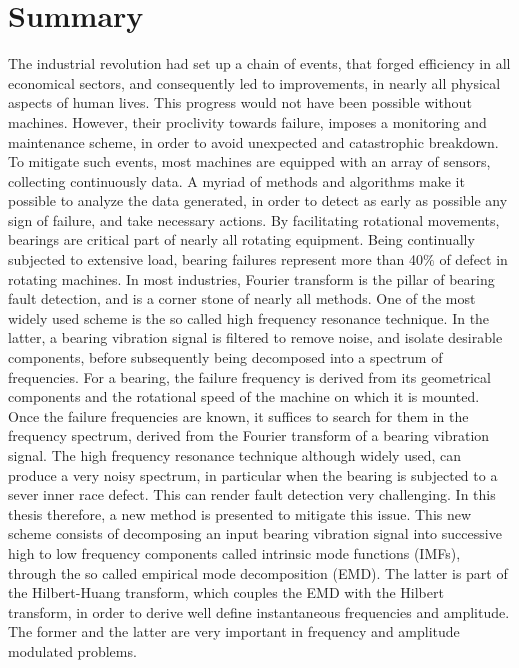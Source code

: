\documentclass[../Main/thesis.tex]{subfiles}
\begin{document}
	\section{Summary}
	\label{sec:summary_and_conclusions}
	The industrial revolution had set up a chain of events, that forged efficiency in all economical sectors, and consequently led to improvements, in nearly all physical aspects of human lives. This progress would not have been possible without machines. However, their proclivity towards failure, imposes a monitoring and maintenance scheme, in order to avoid unexpected and catastrophic breakdown. To mitigate such events, most machines are equipped with an array of sensors, collecting continuously data. A myriad of methods and algorithms make it possible to analyze the data generated, in order to detect as early as possible any sign of failure, and take necessary actions.
	\justify
	By facilitating rotational movements, bearings are critical part of nearly all rotating equipment. Being continually subjected to extensive load, bearing failures represent more than 40$\%$ of defect in rotating machines. In most industries, Fourier transform is the pillar of bearing fault detection, and is a corner stone of nearly all methods.
	One of the most widely used scheme is the so called high frequency resonance technique. 
	In the latter, a bearing vibration signal is filtered to remove noise, and isolate desirable components, before subsequently being decomposed into a spectrum of frequencies. For a bearing, the failure frequency is derived from its geometrical components and the rotational speed of the machine on which it is mounted. Once the failure frequencies are known, it suffices to search for them in the frequency spectrum, derived from the Fourier transform of a bearing vibration signal. 
	\justify
	The high frequency resonance technique although widely used, can produce a very noisy spectrum, in particular when the bearing is subjected to a sever inner race defect. This can render fault detection very challenging. In this thesis therefore, a new method is presented to mitigate this issue.
	This new scheme consists of decomposing an input bearing vibration signal into successive high to low frequency components called intrinsic mode functions (IMFs), through the so called empirical mode decomposition (EMD). The latter is part of the Hilbert-Huang transform, which couples the EMD with the Hilbert transform, in order to derive well define instantaneous frequencies and amplitude. The former and the latter are very important in frequency and amplitude modulated problems.
\end{document}
